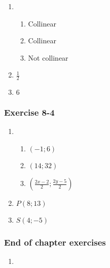 {\begin{multicols}{3}
\begin{enumerate}[noitemsep, label=\textbf{\arabic*}. ]
\item %
\begin{enumerate}[noitemsep, label=\textbf{(\alph*)} ]
\item Collinear%
\item Collinear%
\item Not collinear %
\end{enumerate}
\item $\frac{1}{2}$%
\item $6$%
\end{enumerate}
\subsubsection*{Exercise 8-4} %
\begin{enumerate}[noitemsep, label=\textbf{\arabic*}. ]
\item %
  \begin{enumerate}[noitemsep, label=\textbf{(\alph*)} ]
\item $(-1 ; 6)$%
\item $(14 ; 32)$%
\item $(\frac{2x - 2}{2} ; \frac{2y - 5}{2})$%
\end{enumerate}

\item $P(8 ; 13)$%
\item $S(4 ; -5)$%

\end{enumerate}
\subsubsection*{End of chapter exercises} %

\begin{enumerate}[noitemsep, label=\textbf{\arabic*}. ] 
\item %


\end{enumerate}
\end{multicols}}
